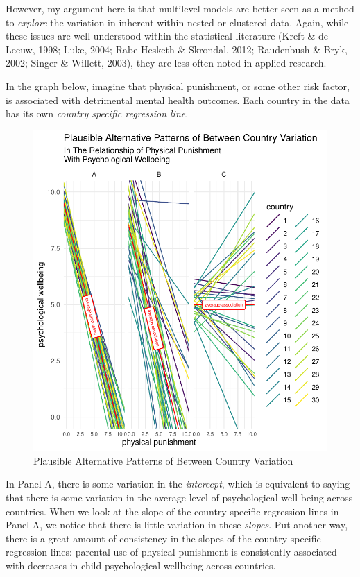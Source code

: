 \documentclass[
  letterpaper,
  DIV=11,
  numbers=noendperiod]{scrreprt}
\begin{document}
However, my argument here is that multilevel models are better seen as a
method to \emph{explore} the variation in inherent within nested or
clustered data. Again, while these issues are well understood within the
statistical literature (Kreft \& de Leeuw, 1998; Luke, 2004;
Rabe-Hesketh \& Skrondal, 2012; Raudenbush \& Bryk, 2002; Singer \&
Willett, 2003), they are less often noted in applied research.

In the graph below, imagine that physical punishment, or some other risk
factor, is associated with detrimental mental health outcomes. Each
country in the data has its own \emph{country specific regression line}.

\begin{figure}

{\centering \includegraphics{./intro_files/figure-pdf/fig-variation1-1.pdf}

}

\caption{\label{fig-variation1}Plausible Alternative Patterns of Between
Country Variation}

\end{figure}

In Panel A, there is some variation in the \emph{intercept}, which is
equivalent to saying that there is some variation in the average level
of psychological well-being across countries. When we look at the slope
of the country-specific regression lines in Panel A, we notice that
there is little variation in these \emph{slopes}. Put another way, there
is a great amount of consistency in the slopes of the country-specific
regression lines: parental use of physical punishment is consistently
associated with decreases in child psychological wellbeing across
countries.
\end{document}
